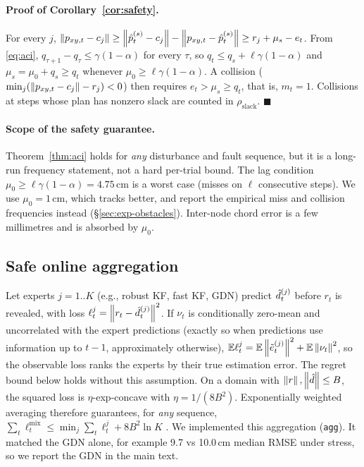 \paragraph{Proof of Corollary~\ref{cor:safety}.}
For every $j$, $\left\lVert p_{xy,t}-c_j \right\rVert\ge\left\lVert \hat p^{(s)}_t-c_j \right\rVert-\left\lVert p_{xy,t}-\hat p^{(s)}_t \right\rVert\ge r_j+\mu_s-e_t$.
From \eqref{eq:aci}, $q_{\tau+1}-q_\tau\le\gamma(1-\alpha)$ for every $\tau$, so $q_t\le q_s+\ell\gamma(1-\alpha)$ and $\mu_s=\mu_0+q_s\ge q_t$ whenever $\mu_0\ge\ell\gamma(1-\alpha)$.
A collision ($\min_j(\left\lVert p_{xy,t}-c_j \right\rVert-r_j)<0$) then requires $e_t>\mu_s\ge q_t$, that is, $m_t=1$. Collisions at steps whose plan has nonzero slack are counted in $\rho_{\mathrm{slack}}$. \hfill$\blacksquare$

\paragraph{Scope of the safety guarantee.}
Theorem~\ref{thm:aci} holds for \emph{any} disturbance and fault sequence, but it is a long-run frequency statement, not a hard per-trial bound. The lag condition $\mu_0\ge\ell\gamma(1-\alpha)=4.75$\,cm is a worst case (misses on $\ell$ consecutive steps). We use $\mu_0=1$\,cm, which tracks better, and report the empirical miss and collision frequencies instead (\S\ref{sec:exp-obstacles}). Inter-node chord error is a few millimetres and is absorbed by $\mu_0$.

\subsection{Safe online aggregation}
\label{app:aggregation}
Let experts $j=1..K$ (e.g., robust KF, fast KF, GDN) predict $\hat d^{(j)}_t$ before $r_t$ is revealed, with loss $\ell^j_t=\left\lVert r_t-\hat d^{(j)}_t \right\rVert^2$.
If $\nu_t$ is conditionally zero-mean and uncorrelated with the expert predictions (exactly so when predictions use information up to $t-1$, approximately otherwise), $\mathbb{E}\ell^j_t=\mathbb{E}\left\lVert \tilde e^{(j)}_t \right\rVert^2+\mathbb{E}\left\lVert \nu_t \right\rVert^2$, so the observable loss ranks the experts by their true estimation error. The regret bound below holds without this assumption.
On a domain with $\left\lVert r \right\rVert,\left\lVert \hat d \right\rVert\le B$, the squared loss is $\eta$-exp-concave with $\eta=1/(8B^2)$. Exponentially weighted averaging therefore guarantees, for \emph{any} sequence, $\sum_t\ell^{\mathrm{mix}}_t\le\min_j\sum_t\ell^j_t+8B^2\ln K$ \citep{cesabianchi2006prediction}.
We implemented this aggregation (\texttt{agg}). It matched the GDN alone, for example 9.7 vs 10.0\,cm median RMSE under stress, so we report the GDN in the main text.
